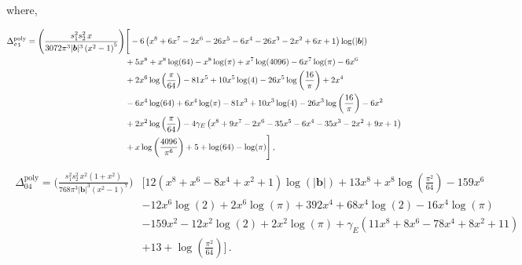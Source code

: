 \enlargethispage{2\baselineskip}
where, 
\begin{thesiscompactdisplay}
\begin{align}
    \begin{split}
    \Delta_{\mathfrak{03}}^{\textrm{poly}}= \Bigg(\frac{s_1^2s_2^2\,x} {3072 \pi ^3 |\boldsymbol{b}|^3 \left(x^2-1\right)^5 }\Bigg)&\Bigg[-6 \left(x^8+6 x^7-2 x^6-26 x^5-6 x^4-26 x^3-2 x^2+6 x+1\right) \log (|\boldsymbol{b}|)\\&\hspace{0 cm}+5 x^8+x^8 \log (64)-x^8 \log (\pi )+x^7 \log (4096)-6 x^7 \log (\pi )-6 x^6\\ &+2 x^6 \log \left(\frac{\pi }{64}\right)-81 x^5+10 x^5 \log (4)-26 x^5 \log \left(\frac{16}{\pi }\right)+2 x^4\\ &-6 x^4 \log (64)+6 x^4 \log (\pi )-81 x^3+10 x^3 \log (4)-26 x^3 \log \left(\frac{16}{\pi }\right)-6 x^2\\ &+2 x^2 \log \left(\frac{\pi }{64}\right)-4 \gamma_E  \left(x^8+9 x^7-2 x^6-35 x^5-6 x^4-35 x^3-2 x^2+9 x+1\right)\\ &+x \log \left(\frac{4096}{\pi ^6}\right)+5+\log (64)-\log (\pi )\Bigg]\,,
        \end{split}
\end{align}
\begin{align}
    \begin{split}    \Delta_{\mathfrak{04}}^{\textrm{poly}}=\Bigg(\frac{s_1^2s_2^2\,x^2(1+x^2)} {768  \pi ^3 |\boldsymbol{b}|^3 \left(x^2-1\right)^7 }\Bigg)&\Bigg[12 \left(x^8+x^6-8 x^4+x^2+1\right) \log (|\boldsymbol{b}|)+13 x^8+x^8 \log \left(\frac{\pi ^2}{64}\right)-159 x^6\\ &-12 x^6 \log (2)+2 x^6 \log (\pi )+392 x^4+68 x^4 \log (2)-16 x^4 \log (\pi )\\ &-159 x^2-12 x^2 \log (2)+2 x^2 \log (\pi )+\gamma_{E}  \left(11 x^8+8 x^6-78 x^4+8 x^2+11\right)\\ &+13+\log \left(\frac{\pi ^2}{64}\right)\Bigg]\,.
    \end{split}
\end{align}
\end{thesiscompactdisplay}
%       
